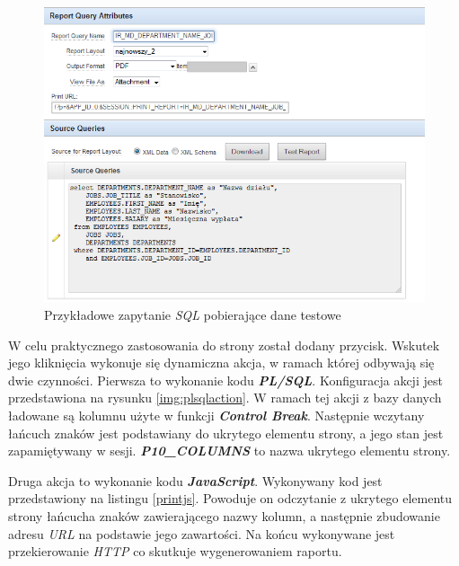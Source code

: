 \documentclass[11pt,a4paper]{article}
\begin{document}
\begin{figure}
\centering
\includegraphics[scale=0.9]{query}
\caption{Przykładowe zapytanie \emph{SQL} pobierające dane testowe}
\label{img:query}
\end{figure}

W celu praktycznego zastosowania do strony został dodany przycisk. Wskutek jego kliknięcia wykonuje się dynamiczna akcja, w ramach której odbywają się dwie czynności. Pierwsza to wykonanie kodu \emph{\textbf{PL/SQL}}. Konfiguracja akcji jest przedstawiona na rysunku \ref{img:plsqlaction}. W ramach tej akcji z bazy danych ładowane są kolumnu użyte w funkcji \emph{\textbf{Control Break}}. Następnie wczytany łańcuch znaków jest podstawiany do ukrytego elementu strony, a jego stan jest zapamiętywany w sesji. \textbf{\emph{P10\_COLUMNS}} to nazwa ukrytego elementu strony. 

Druga akcja to wykonanie kodu \emph{\textbf{JavaScript}}. Wykonywany kod jest przedstawiony na listingu \ref{printjs}. Powoduje on odczytanie z ukrytego elementu strony łańcucha znaków zawierającego nazwy kolumn, a następnie zbudowanie adresu \emph{URL} na podstawie jego zawartości. Na końcu wykonywane jest przekierowanie \emph{HTTP} co skutkuje wygenerowaniem raportu.
\end{document}
